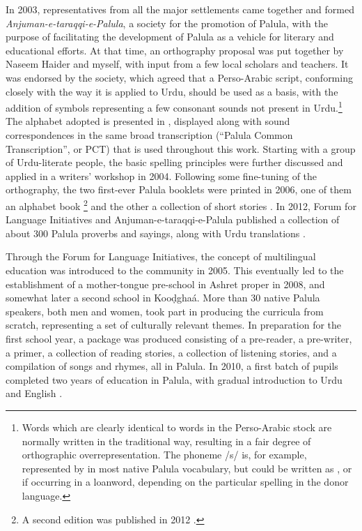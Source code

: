 In 2003, representatives from all the major settlements came together and formed \textit{Anjuman-e-taraqqi-e-Palula}, a society for the promotion of Palula, with the purpose of facilitating the development of Palula as a vehicle for literary and educational efforts. At that time, an orthography proposal was put together by Naseem Haider and myself, with input from a few local scholars and teachers. It was endorsed by the society, which agreed that a Perso-Arabic script, conforming closely with the way it is applied to Urdu, should be used as a basis, with the addition of symbols representing a few consonant sounds not present in Urdu.\footnote{Words which are clearly identical to words in the Perso-Arabic stock are normally written in the traditional way, resulting in a fair degree of orthographic overrepresentation. The phoneme /s/ is, for example, represented by {\large{}} in most native Palula vocabulary, but could be written as {\large{}}, {\large{}} or {\large{}} if occurring in a loanword, depending on the particular spelling in the donor language.} The alphabet adopted is presented in , displayed along with sound correspondences in the same broad transcription (``Palula Common Transcription'', or PCT) that is used throughout this work. Starting with a group of Urdu-literate people, the basic spelling principles were further discussed and applied in a writers’ workshop in 2004. Following some fine-tuning of the orthography, the two first-ever Palula booklets were printed in 2006, one of them an alphabet book \citep{haider2006a}\footnote{A second edition was published in 2012 \citep{haider2012a}.} and the other a collection of short stories \citep{haider2006b}. In 2012, Forum for Language Initiatives and Anjuman-e-taraqqi-e-Palula published a collection of about 300 Palula proverbs and sayings, along with Urdu translations \citep{haider2012b}.


Through the Forum for Language Initiatives, the concept of multilingual education was introduced to the community in 2005. This eventually led to the establishment of a mother-tongue pre-school in Ashret proper in 2008, and somewhat later a second school in Kooḍghaá. More than 30 native Palula speakers, both men and women, took part in producing the curricula from scratch, representing a set of culturally relevant themes. In preparation for the first school year, a package was produced consisting of a pre-reader, a pre-writer, a primer, a collection of reading stories, a collection of listening stories, and a compilation of songs and rhymes, all in Palula. In 2010, a first batch of pupils completed two years of education in Palula, with gradual introduction to Urdu and English \citep{rehmansagar2015}. 


